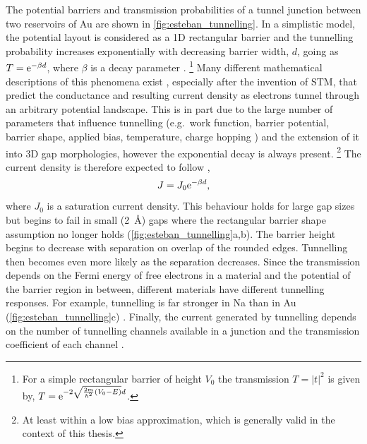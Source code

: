 \documentclass{article}
\begin{document}
The potential barriers and transmission probabilities of a tunnel junction between two reservoirs of Au are shown in \autoref{fig:esteban_tunnelling}. In a simplistic model, the potential layout is considered as a 1D rectangular barrier and the tunnelling probability increases exponentially with decreasing barrier width, $d$, going as $T = \mathrm{e}^{-\beta d}$, where $\beta$ is a decay parameter \cite{griffiths2005introduction}.%
\footnote{For a simple rectangular barrier of height $V_0$ the transmission $T=\left|t\right|^2$ is given by, $T=\mathrm{e}^{-2\sqrt{\frac{2m}{\hbar^2}(V_0 - E)}d}$.}
Many different mathematical descriptions of this phenomena exist \cite{simmons1963generalized, blanco2006stm}, especially after the invention of STM, that predict the conductance and resulting current density as electrons tunnel through an arbitrary potential landscape. This is in part due to the large number of parameters that influence tunnelling (e.g.\ work function, barrier potential, barrier shape, applied bias, temperature, charge hopping \cite{blanco2006stm}) and the extension of it into 3D gap morphologies, however the exponential decay is always present.%
\footnote{At least within a low bias approximation, which is generally valid in the context of this thesis.}
The current density is therefore expected to follow \cite{tan2014},
\begin{equation}
	J = J_0 \mathrm{e}^{-\beta d},
\end{equation}
where $J_0$ is a saturation current density. This behaviour holds for large gap sizes but begins to fail in small (\SI{2}{\angstrom}) gaps where the rectangular barrier shape assumption no longer holds (\autoref{fig:esteban_tunnelling}a,b). The barrier height begins to decrease with separation on overlap of the rounded edges. Tunnelling then becomes even more likely as the separation decreases. Since the transmission depends on the Fermi energy of free electrons in a material and the potential of the barrier region in between, different materials have different tunnelling responses. For example, tunnelling is far stronger in Na than in Au (\autoref{fig:esteban_tunnelling}c) \cite{esteban2015}. Finally, the current generated by tunnelling depends on the number of tunnelling channels available in a junction and the transmission coefficient of each channel \cite{zuloaga2009}. %
\end{document}

